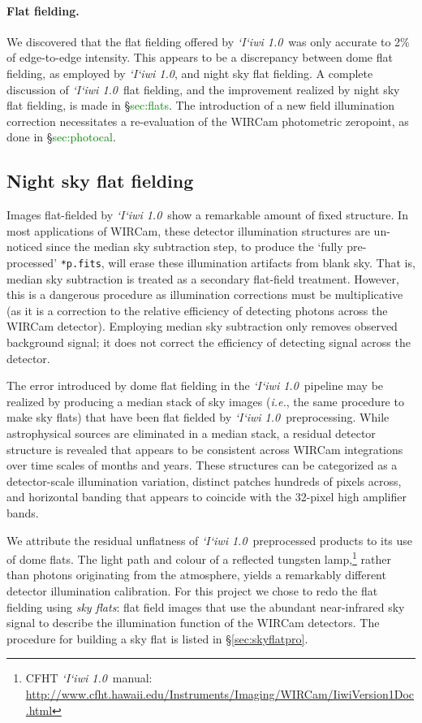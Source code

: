 \documentclass[iop]{emulateapj}
\newcommand{\ie}{\textit{i.e.}}
\newcommand{\sw}[1]{\textit{#1}} %
\newcommand{\iiwione}{\sw{`I`iwi 1.0}}
\newcommand{\todo}[1]{\textcolor{green}{#1}} %
\begin{document}
\paragraph{Flat fielding.} We discovered that the flat fielding offered by \iiwione\ was only accurate to 2\% of edge-to-edge intensity. This appears to be a discrepancy between dome flat fielding, as employed by \iiwione, and night sky flat fielding. A complete discussion of \iiwione\ flat fielding, and the improvement realized by night sky flat fielding, is made in \S \todo{sec:flats}. The introduction of a new field illumination correction necessitates a re-evaluation of the WIRCam photometric zeropoint, as done in \S\todo{sec:photocal}.

\subsection{Night sky flat fielding}
\label{sec:flats}

Images flat-fielded by \iiwione\ show a remarkable amount of fixed structure. In most applications of WIRCam, these detector illumination structures are un-noticed since the median sky subtraction step, to produce the `fully pre-processed' \texttt{*p.fits}, will erase these illumination artifacts from blank sky. That is, median sky subtraction is treated as a secondary flat-field treatment. However, this is a dangerous procedure as illumination corrections must be multiplicative (as it is a correction to the relative efficiency of detecting photons across the WIRCam detector). Employing median sky subtraction only removes observed background signal; it does not correct the efficiency of detecting signal across the detector.

The error introduced by dome flat fielding in the \iiwione\ pipeline may be realized by producing a median stack of sky images (\ie, the same procedure to make sky flats) that have been flat fielded by \iiwione\ preprocessing. While astrophysical sources are eliminated in a median stack, a residual detector structure is revealed that appears to be consistent across WIRCam integrations over time scales of months and years. These structures can be categorized as a detector-scale illumination variation, distinct patches hundreds of pixels across, and horizontal banding that appears to coincide with the 32-pixel high amplifier bands.

We attribute the residual unflatness of \iiwione\ preprocessed products to its use of dome flats. The light path and colour of a reflected tungsten lamp,\footnote{CFHT \iiwione\ manual: \url{http://www.cfht.hawaii.edu/Instruments/Imaging/WIRCam/IiwiVersion1Doc.html}} rather than photons originating from the atmosphere, yields a remarkably different detector illumination calibration. For this project we chose to redo the flat fielding using \emph{sky flats}: flat field images that use the abundant near-infrared sky signal to describe the illumination function of the WIRCam detectors. The procedure for building a sky flat is listed in \S\ref{sec:skyflatpro}.
\end{document}
